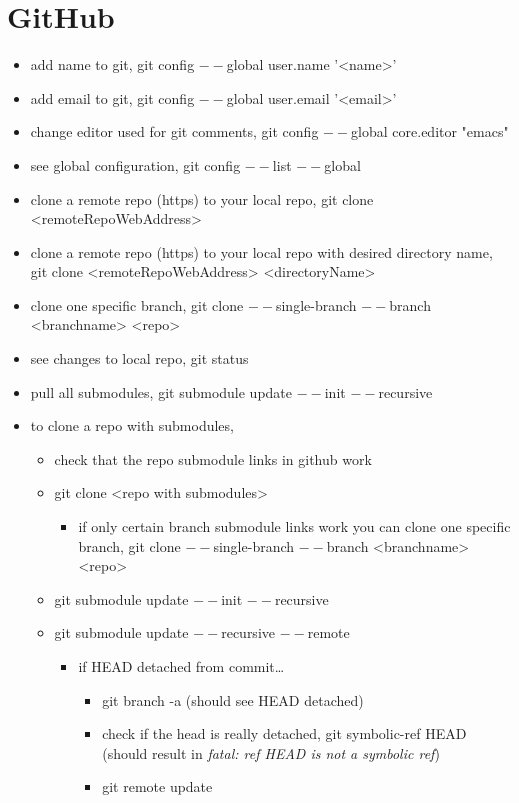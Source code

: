 \documentclass[11pt]{article}
\begin{document}
\section{GitHub}
\label{sec:org7465844}
\begin{itemize}
\item add name to git, git config \(--\)global user.name '<name>'
\item add email to git, git config \(--\)global user.email '<email>'
\item change editor used for git comments, git config \(--\)global core.editor "emacs"
\item see global configuration, git config \(--\)list \(--\)global
\item clone a remote repo (https) to your local repo, git clone <remoteRepoWebAddress>
\item clone a remote repo (https) to your local repo with desired directory name, git clone <remoteRepoWebAddress> <directoryName>
\item clone one specific branch, git clone \(--\)single-branch \(--\)branch <branchname> <repo>
\item see changes to local repo, git status
\item pull all submodules, git submodule update \(--\)init \(--\)recursive
\item to clone a repo with submodules,
\begin{itemize}
\item check that the repo submodule links in github work
\item git clone <repo with submodules>
\begin{itemize}
\item if only certain branch submodule links work you can clone one specific branch, git clone \(--\)single-branch \(--\)branch <branchname> <repo>
\end{itemize}
\item git submodule update \(--\)init \(--\)recursive
\item git submodule update \(--\)recursive \(--\)remote
\begin{itemize}
\item if HEAD detached from commit\ldots{}
\begin{itemize}
\item git branch -a (should see HEAD detached)
\item check if the head is really detached, git symbolic-ref HEAD (should result in \emph{fatal: ref HEAD is not a symbolic ref})
\item git remote update

\end{itemize}
\end{itemize}
\end{itemize}
\end{itemize}
\end{document}
